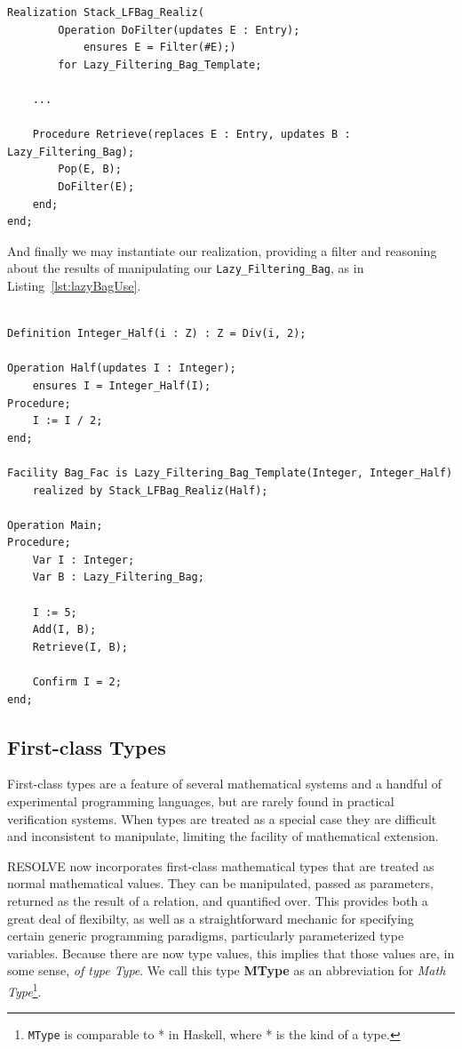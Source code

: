 \begin{lstlisting}[float=h,language=resolve,caption={A partial realization of \texttt{Lazy\_Filtering\_Bag}\label{lst:lazyBagImpl}}]
Realization Stack_LFBag_Realiz(
		Operation DoFilter(updates E : Entry);
			ensures E = Filter(#E);)
		for Lazy_Filtering_Bag_Template;

	...

	Procedure Retrieve(replaces E : Entry, updates B : Lazy_Filtering_Bag);
		Pop(E, B);
		DoFilter(E);
	end;
end;
\end{lstlisting}

And finally we may instantiate our realization, providing a filter and reasoning about the results of manipulating our \texttt{Lazy\_Filtering\_Bag}, as in Listing~\ref{lst:lazyBagUse}.

\begin{lstlisting}[float=h,language=resolve,caption={An example of instantiating and using a \texttt{Lazy\_Filtering\_Bag}\label{lst:lazyBagUse}}]

Definition Integer_Half(i : Z) : Z = Div(i, 2);

Operation Half(updates I : Integer);
	ensures I = Integer_Half(I); 
Procedure;
	I := I / 2;
end;

Facility Bag_Fac is Lazy_Filtering_Bag_Template(Integer, Integer_Half)
	realized by Stack_LFBag_Realiz(Half);

Operation Main;
Procedure;
	Var I : Integer;
	Var B : Lazy_Filtering_Bag;

	I := 5;
	Add(I, B);
	Retrieve(I, B);

	Confirm I = 2;
end;
\end{lstlisting}

	\subsection{First-class Types\label{firstClassTypes}}

First-class types are a feature of several mathematical systems and a handful of experimental programming languages, but are rarely found in practical verification systems.  When types are treated as a special case they are difficult and inconsistent to manipulate, limiting the facility of mathematical extension.

RESOLVE now incorporates first-class mathematical types that are treated as normal mathematical values.  They can be manipulated, passed as parameters, returned as the result of a relation, and quantified over.  This provides both a great deal of flexibilty, as well as a straightforward mechanic for specifying certain generic programming paradigms, particularly parameterized type variables.  Because there are now type values, this implies that those values are, in some sense, \emph{of type Type}.  We call this type \textbf{MType} as an abbreviation for \emph{Math Type}\footnote{\texttt{MType} is comparable to * in Haskell, where * is the kind of a type.}.

